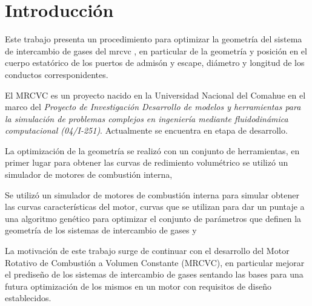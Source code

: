\chapter{Introducción}

Este trabajo presenta un procedimiento para optimizar la geometría del sistema
de intercambio de gases del \gls{mrcvc}
\cite{toth}, en particular de la geometría y posición en el cuerpo estatórico
de los puertos de admisón y escape, diámetro y longitud de los conductos
corresponidentes.

El MRCVC es un proyecto nacido en la Universidad Nacional del Comahue en el
marco del \emph{Proyecto de Investigación Desarrollo de modelos y herramientas
para la simulación de problemas complejos en ingeniería mediante
fluidodinámica computacional (04/I-251)}. Actualmente se encuentra en etapa
de desarrollo.

La optimización de la geometría se realizó con un conjunto de herramientas, en
primer lugar para obtener las curvas de redimiento volumétrico se utilizó un
simulador de motores de combustión interna, 

Se utilizó un simulador de motores de combustión interna para simular obtener
las curvas características del motor, curvas que se utilizan para dar un
puntaje a una algoritmo genético para optimizar el conjunto de parámetros que
definen la geometría de los sistemas de intercambio de gases y 

La motivación de este trabajo surge de continuar con el desarrollo del Motor
Rotativo de Combustión a Volumen Constante (MRCVC), en particular
mejorar el prediseño de los sistemas de intercambio de gases sentando las bases
para una futura optimización de los mismos en un motor con requisitos de diseño
establecidos.
